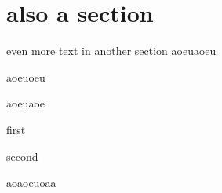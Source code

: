 \section{also a section}
even more text in another section
aoeuaoeu

aoeuoeu \cite{Hansen_2015}

aoeuaoe \cite{Hansen_2011}

first

second

aoaoeuoaa
